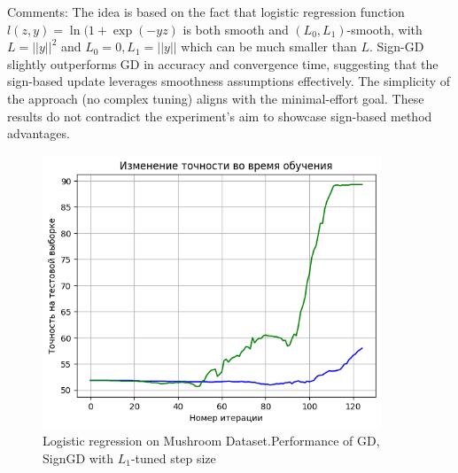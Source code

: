 \documentclass[12pt]{article}
\begin{document}
Comments: 
The idea is based on the fact that logistic regression function $l(z,y) = \ln (1 + \exp(-yz)$  is both smooth and $(L_0, L_1)$-smooth, with $L = || y ||^2$ and $L_0 = 0, L_1 = || y ||$ which can be much smaller than $L$. Sign-GD slightly outperforms GD in accuracy and convergence time, suggesting that the sign-based update leverages smoothness assumptions effectively. The simplicity of the approach (no complex tuning) aligns with the minimal-effort goal. These results do not contradict the experiment’s aim to showcase sign-based method advantages.
\begin{figure}[!h]
    \centering
    \includegraphics[width=0.9\textwidth]{basic_experiment.png}
    \caption{Logistic regression on Mushroom Dataset.\newline Performance of GD, SignGD with $L_1 $-tuned step size}
    \label{fig:logreg}
\end{figure}




\newpage

\printbibliography
\end{document}
